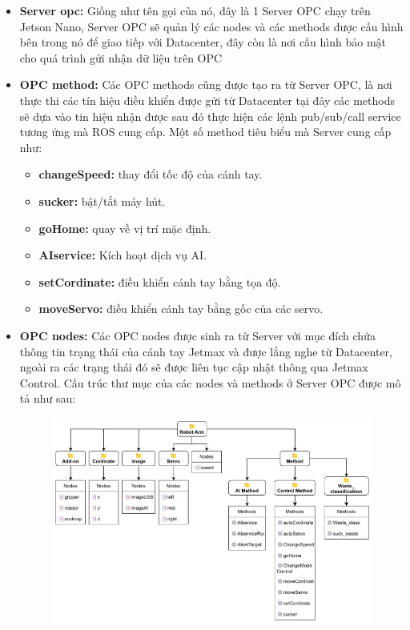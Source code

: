 \begin{itemize}
    \item \textbf{Server opc:} Giống như tên gọi của nó, đây là 1 Server OPC chạy trên Jetson Nano, Server OPC sẽ quản lý các nodes và các methods được cấu hình bên trong nó để giao tiếp với Datacenter, đây còn là nơi cấu hình bảo mật cho quá trình gửi nhận dữ liệu trên OPC
    \item \textbf{OPC method:} Các OPC methods cũng được tạo ra từ Server OPC, là nơi thực thi các tín hiệu điều khiển được gửi từ Datacenter tại đây các methods sẽ dựa vào tin hiệu nhận được sau đó thực hiện các lệnh pub/sub/call service tương ứng mà ROS cung cấp. Một số method tiêu biểu mà Server cung cấp như:
    \begin{itemize}
        \item \textbf{changeSpeed:} thay đổi tốc độ của cánh tay.
        \item \textbf{sucker:} bật/tắt máy hút.
        \item \textbf{goHome:} quay về vị trí mặc định.
        \item \textbf{AIservice:} Kích hoạt dịch vụ AI.
        \item \textbf{setCordinate:} điều khiển cánh tay bằng tọa độ.
        \item \textbf{moveServo:} điều khiển cánh tay bằng gốc của các servo.
    \end{itemize}
    \item \textbf{OPC nodes:} Các OPC nodes được sinh ra từ Server với mục đích chứa thông tin trạng thái của cánh tay Jetmax và được lắng nghe từ Datacenter, ngoài ra các trạng thái đó sẽ được liên tục cập nhật thông qua Jetmax Control. Cấu trúc thư mục của các nodes và methods ở Server OPC được mô tả như sau:
        \begin{figure}[!h]
        \centering
            \includegraphics[width=1\textwidth]{Images/Implementation/Control/opc_structure.jpg}

\end{figure}
\end{itemize}
